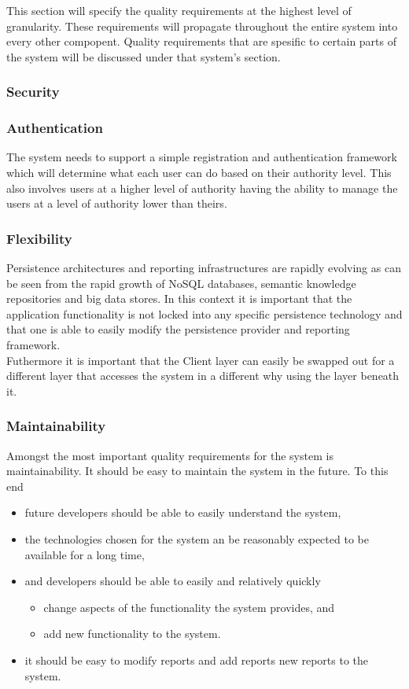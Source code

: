 This section will specify the quality requirements at the highest level of
granularity. These requirements will propagate throughout the entire system
into every other compopent. Quality requirements that are spesific to certain
parts of the system will be discussed under that system's section.
\subsubsection{Security}
\label{sec:securityQualityRequirement}
\subsubsection{Authentication}
The system needs to support a simple registration and authentication framework
which will determine what each user can do based on their authority level. This
also involves users at a higher level of authority having the ability to manage
the users at a level of authority lower than theirs.
\subsubsection{Flexibility}
Persistence architectures and reporting infrastructures are rapidly evolving as can
be seen from the rapid growth of NoSQL databases, semantic knowledge repositories and big data
stores. In this context it is important that the application functionality is not locked into any
specific persistence technology and that one is able to easily modify the persistence provider and
reporting framework.\\
Futhermore it is important that the Client layer can easily be swapped out for a different
layer that accesses the system in a different why using the layer beneath it.
\subsubsection{Maintainability}
Amongst the most important quality requirements for the system is
maintainability. It should be easy to maintain the system in the future. To this end

\begin{itemize}
\item future developers should be able to easily understand the system,
\item the technologies chosen for the system an be reasonably expected to be available for a long
time,
\item and developers should be able to easily and relatively quickly
	\begin{itemize}
		\item change aspects of the functionality the system provides, and
		\item add new functionality to the system.
	\end{itemize}
\item it should be easy to modify reports and add reports new reports to the system.
\end{itemize}

